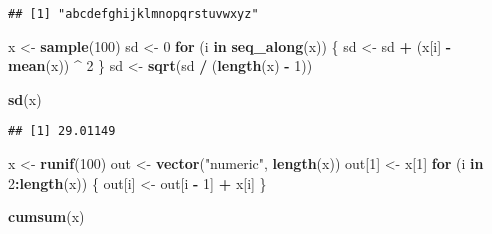 \documentclass[]{article}
\newenvironment{Shaded}{\begin{snugshade}}{\end{snugshade}}
\newcommand{\KeywordTok}[1]{\textcolor[rgb]{0.13,0.29,0.53}{\textbf{#1}}}
\newcommand{\DecValTok}[1]{\textcolor[rgb]{0.00,0.00,0.81}{#1}}
\newcommand{\StringTok}[1]{\textcolor[rgb]{0.31,0.60,0.02}{#1}}
\newcommand{\ControlFlowTok}[1]{\textcolor[rgb]{0.13,0.29,0.53}{\textbf{#1}}}
\newcommand{\OperatorTok}[1]{\textcolor[rgb]{0.81,0.36,0.00}{\textbf{#1}}}
\newcommand{\NormalTok}[1]{#1}
\begin{document}
\begin{verbatim}
## [1] "abcdefghijklmnopqrstuvwxyz"
\end{verbatim}

\begin{Shaded}
\begin{Highlighting}[]
\NormalTok{x <-}\StringTok{ }\KeywordTok{sample}\NormalTok{(}\DecValTok{100}\NormalTok{)}
\NormalTok{sd <-}\StringTok{ }\DecValTok{0}
\ControlFlowTok{for}\NormalTok{ (i }\ControlFlowTok{in} \KeywordTok{seq_along}\NormalTok{(x)) \{}
\NormalTok{  sd <-}\StringTok{ }\NormalTok{sd }\OperatorTok{+}\StringTok{ }\NormalTok{(x[i] }\OperatorTok{-}\StringTok{ }\KeywordTok{mean}\NormalTok{(x)) }\OperatorTok{^}\StringTok{ }\DecValTok{2}
\NormalTok{\}}
\NormalTok{sd <-}\StringTok{ }\KeywordTok{sqrt}\NormalTok{(sd }\OperatorTok{/}\StringTok{ }\NormalTok{(}\KeywordTok{length}\NormalTok{(x) }\OperatorTok{-}\StringTok{ }\DecValTok{1}\NormalTok{))}

\KeywordTok{sd}\NormalTok{(x)}
\end{Highlighting}
\end{Shaded}

\begin{verbatim}
## [1] 29.01149
\end{verbatim}

\begin{Shaded}
\begin{Highlighting}[]
\NormalTok{x <-}\StringTok{ }\KeywordTok{runif}\NormalTok{(}\DecValTok{100}\NormalTok{)}
\NormalTok{out <-}\StringTok{ }\KeywordTok{vector}\NormalTok{(}\StringTok{"numeric"}\NormalTok{, }\KeywordTok{length}\NormalTok{(x))}
\NormalTok{out[}\DecValTok{1}\NormalTok{] <-}\StringTok{ }\NormalTok{x[}\DecValTok{1}\NormalTok{]}
\ControlFlowTok{for}\NormalTok{ (i }\ControlFlowTok{in} \DecValTok{2}\OperatorTok{:}\KeywordTok{length}\NormalTok{(x)) \{}
\NormalTok{  out[i] <-}\StringTok{ }\NormalTok{out[i }\OperatorTok{-}\StringTok{ }\DecValTok{1}\NormalTok{] }\OperatorTok{+}\StringTok{ }\NormalTok{x[i]}
\NormalTok{\}}

\KeywordTok{cumsum}\NormalTok{(x)}
\end{Highlighting}
\end{Shaded}
\end{document}
